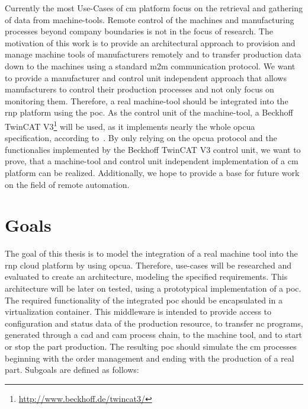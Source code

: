 \documentclass[
a4paper,
twoside,
headsepline,
cleardoublepage=empty,
parskip=half,
draft=false
]{scrbook}
\begin{document}
			Currently the most Use-Cases of \gls{cm} platform focus on the retrieval and gathering of data from machine-tools.
			Remote control of the machines and manufacturing processes beyond company boundaries is not in the focus of research.
			The motivation of this work is to provide an architectural approach to provision and manage machine tools of manufacturers remotely and to transfer production data down to the machines using a standard \gls{m2m} communication protocol.
			We want to provide a manufacturer and control unit independent approach that allows manufacturers to control their production processes and not only focus on monitoring them. Therefore, a real machine-tool should be integrated into the \gls{rnp} platform using the \gls{poc}.
			As the control unit of the machine-tool, a Beckhoff TwinCAT V3\footnote{\url{http://www.beckhoff.de/twincat3/}} will be used, as it implements nearly the whole \gls{opcua} specification, according to~\cite{twincat2018}.
			By only relying on the \gls{opcua} protocol and the functionalies implemented by the Beckhoff TwinCAT V3 control unit, we want to prove, that a machine-tool and control unit independent implementation of a \gls{cm} platform can be realized.
			Additionally, we hope to provide a base for future work on the field of remote automation.

		\section{Goals}\label{sec:goals}

			The goal of this thesis is to model the integration of a real machine tool into the \gls{rnp} cloud platform by using \gls{opcua}.
			Therefore, use-cases will be researched and evaluated to create an architecture, modeling the specified requirements.
			This architecture will be later on tested, using a prototypical implementation of a \gls{poc}.
			The required functionality of the integrated \gls{poc} should be encapsulated in a virtualization container.
			This middleware is intended to provide access to configuration and status data of the production resource, to transfer \gls{nc} programs, generated through a \gls{cad} and \gls{cam} process chain, to the machine tool, and to start or stop the part production. The resulting \gls{poc} should simulate the \gls{cm} processes beginning with the order management and ending with the production of a real part. Subgoals are defined as follows:
\end{document}
